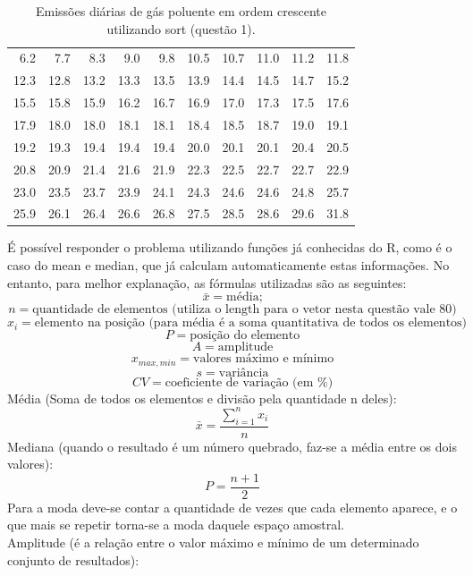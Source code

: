 \documentclass[12pt,a4paper]{article}
\begin{document}
\begin{table}[!h]
\centering
\begin{tabular}{rrrrrrrrrr}
6.2 & 7.7 & 8.3 & 9.0 & 9.8 & 10.5 & 10.7 & 11.0 & 11.2 & 11.8 \\
12.3 & 12.8 & 13.2 & 13.3 & 13.5 & 13.9 & 14.4 & 14.5 & 14.7 & 15.2 \\
15.5 & 15.8 & 15.9 & 16.2 & 16.7 & 16.9 & 17.0 & 17.3 & 17.5 & 17.6 \\
17.9 & 18.0 & 18.0 & 18.1 & 18.1 & 18.4 & 18.5 & 18.7 & 19.0 & 19.1 \\
19.2 & 19.3 & 19.4 & 19.4 & 19.4 & 20.0 & 20.1 & 20.1 & 20.4 & 20.5 \\
20.8 & 20.9 & 21.4 & 21.6 & 21.9 & 22.3 & 22.5 & 22.7 & 22.7 & 22.9 \\
23.0 & 23.5 & 23.7 & 23.9 & 24.1 & 24.3 & 24.6 & 24.6 & 24.8 & 25.7 \\
25.9 & 26.1 & 26.4 & 26.6 & 26.8 & 27.5 & 28.5 & 28.6 & 29.6 & 31.8 \\
\end{tabular}
\caption{Emissões diárias de gás poluente em ordem crescente utilizando sort (questão 1).}
\end{table}
É possível responder o problema utilizando funções já conhecidas do R, como é o caso do mean e median, que já calculam automaticamente estas informações. No entanto, para melhor explanação, as fórmulas utilizadas são as seguintes:\\
\[\bar{x} =\text{média;}\]
\[n=\text{quantidade de elementos (utiliza o length para o vetor nesta questão vale 80)}\]
\[x_i=\text{elemento na posição (para média é a soma quantitativa de todos os elementos)}\]
\[P=\text{posição do elemento}\]
\[A=\text{amplitude}\]
\[x_{max,min}=\text{valores máximo e mínimo}\]
\[s=\text{variância}\]
\[CV=\text{coeficiente de variação (em \%)}\]
Média (Soma de todos os elementos e divisão pela quantidade n deles):
\begin{equation} \label{media}
  \bar{x} = \frac{\sum_{i=1}^{n} x_i}{n} %
\end{equation}
Mediana (quando o resultado é um número quebrado, faz-se a média entre os dois valores):
\begin{equation}\label{mediana}
    P = \frac{n + 1}{2}
  \end{equation}
Para a moda deve-se contar a quantidade de vezes que cada elemento aparece, e o que mais se repetir torna-se a moda daquele espaço amostral. \\
Amplitude (é a relação entre o valor máximo e mínimo de um determinado conjunto de resultados):
\end{document}

